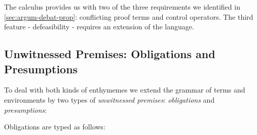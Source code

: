 \documentclass{article}
\begin{document}
The \matilda calculus provides us with two of the three requirements we identified in \cref{sec:argum-debat-prop}: conflicting proof terms and control operators. The third feature - defeasibility - requires an extension of the language.

\subsection{Unwitnessed Premises: Obligations and Presumptions}


To deal with both kinds of enthymemes we extend the grammar of \matilda terms and environments by two types of \emph{unwitnessed premises}: \emph{obligations} and \emph{presumptions}:

\begin{grammar}
\end{grammar}



Obligations are typed as follows:

\begin{center}
  \begin{minipage}{0.48\linewidth}
    \begin{prooftree}
      \label{rule:termenth}
    \end{prooftree}
  \end{minipage}

  \begin{minipage}{0.48\linewidth}
    \begin{prooftree}
      \label{rule:contextenth}
    \end{prooftree}
  \end{minipage}
\end{center}
\end{document}
